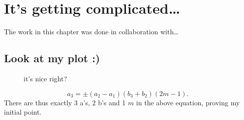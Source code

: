 

\Clear
\chapter{It's getting complicated\dots}
\label{cha:it_s_getting_complicated...}

The work in this chapter was done in collaboration with\dots

\section{Look at my plot :)}
\label{sec:look_at_my_plot_}

\begin{figure}
	\centering
	\caption{it's nice right?}
	\label{fig:look_at_it}
\end{figure}

%
\begin{equation}
a_3 = \pm (a_2-a_1)(b_3+b_2)(2m-1).
\end{equation}
%
There are thus exactly $3$ a's, $2$ b's and 1 $m$ in the above equation, proving my initial point.

